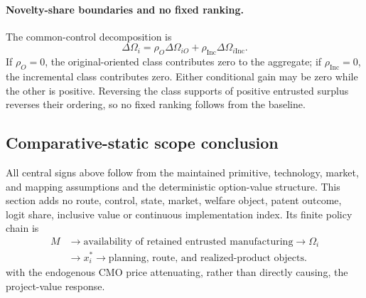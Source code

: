 \paragraph{Novelty-share boundaries and no fixed ranking.}
The common-control decomposition is
\begin{equation}
  \Delta\Omega_i
  =
  \rho_O\Delta\Omega_{iO}
  +
  \rho_{\mathrm{Inc}}\Delta\Omega_{i\mathrm{Inc}}.
  \label{eq:p15-novelty-boundary}
\end{equation}
If \(\rho_O=0\), the original-oriented class contributes zero to the aggregate;
if \(\rho_{\mathrm{Inc}}=0\), the incremental class contributes zero. Either
conditional gain may be zero while the other is positive. Reversing the class
supports of positive entrusted surplus reverses their ordering, so no fixed
ranking follows from the baseline.

\subsection{Comparative-static scope conclusion}
\label{subsec:p15-scope}

All central signs above follow from the maintained primitive, technology,
market, and mapping assumptions and
the deterministic option-value structure. This section adds no route, control,
state, market, welfare object, patent outcome, logit share, inclusive value or
continuous implementation index. Its finite policy chain is
\[
  \begin{aligned}
  M
  &\longrightarrow
  \text{availability of retained entrusted manufacturing}
  \longrightarrow
  \Omega_i \\
  &\longrightarrow
  x_i^*
  \longrightarrow
  \text{planning, route, and realized-product objects}.
  \end{aligned}
\]
with the endogenous CMO price attenuating, rather than directly causing, the
project-value response.
